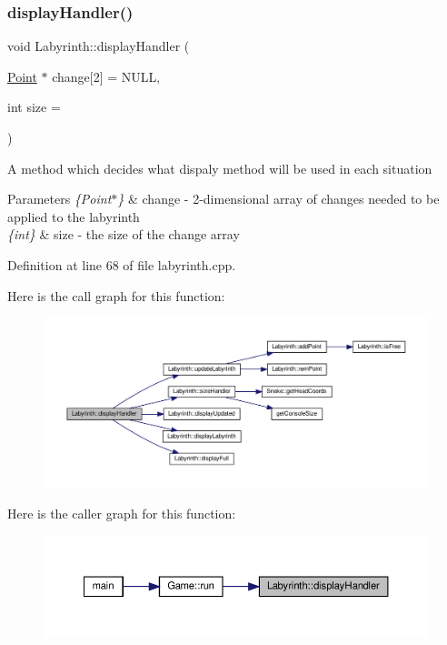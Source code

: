 \subsubsection{\texorpdfstring{displayHandler()}{displayHandler()}}
{\footnotesize\ttfamily void Labyrinth\+::display\+Handler (\begin{DoxyParamCaption}\item[{\mbox{\hyperlink{common_8h_aa9cfdb80b4ca12013a2de8a3b9b97981}{Point}} $\ast$}]{change\mbox{[}2\mbox{]} = {\ttfamily NULL},  }\item[{int}]{size = {} }\end{DoxyParamCaption})}

A method which decides what dispaly method will be used in each situation 
\begin{DoxyParams}{Parameters}
{\em \{\+Point$\ast$\}} & change -\/ 2-\/dimensional array of changes needed to be applied to the labyrinth \\
\hline
{\em \{int\}} & size -\/ the size of the change array \\
\hline
\end{DoxyParams}


Definition at line 68 of file labyrinth.\+cpp.

Here is the call graph for this function\+:
\nopagebreak
\begin{figure}[H]
\begin{center}
\leavevmode
\includegraphics[width=350pt]{class_labyrinth_a02c42abb1b58fdf8a20b66bddd0bbe00_cgraph}
\end{center}
\end{figure}
Here is the caller graph for this function\+:
\nopagebreak
\begin{figure}[H]
\begin{center}
\leavevmode
\includegraphics[width=350pt]{class_labyrinth_a02c42abb1b58fdf8a20b66bddd0bbe00_icgraph}
\end{center}
\end{figure}
\mbox{\label{class_labyrinth_a676e53a7bced45343af8307eae2ba2d0}} 
